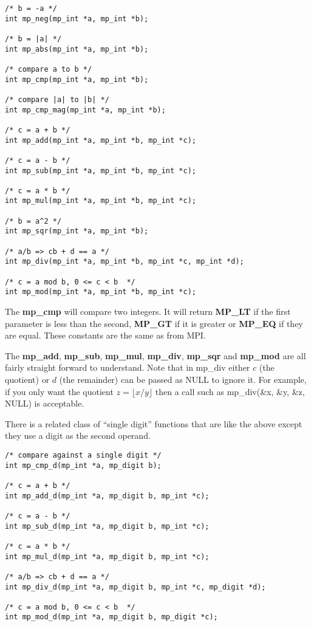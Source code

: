 \documentclass{article}
\begin{document}
\begin{verbatim}
/* b = -a */
int mp_neg(mp_int *a, mp_int *b);

/* b = |a| */
int mp_abs(mp_int *a, mp_int *b);

/* compare a to b */
int mp_cmp(mp_int *a, mp_int *b);

/* compare |a| to |b| */
int mp_cmp_mag(mp_int *a, mp_int *b);

/* c = a + b */
int mp_add(mp_int *a, mp_int *b, mp_int *c);

/* c = a - b */
int mp_sub(mp_int *a, mp_int *b, mp_int *c);

/* c = a * b */
int mp_mul(mp_int *a, mp_int *b, mp_int *c);

/* b = a^2 */
int mp_sqr(mp_int *a, mp_int *b);

/* a/b => cb + d == a */
int mp_div(mp_int *a, mp_int *b, mp_int *c, mp_int *d);

/* c = a mod b, 0 <= c < b  */
int mp_mod(mp_int *a, mp_int *b, mp_int *c);
\end{verbatim}

The \textbf{mp\_cmp} will compare two integers.  It will return \textbf{MP\_LT} if the first parameter is less than
the second, \textbf{MP\_GT} if it is greater or \textbf{MP\_EQ} if they are equal.  These constants are the same as from
MPI.

The \textbf{mp\_add}, \textbf{mp\_sub}, \textbf{mp\_mul}, \textbf{mp\_div}, \textbf{mp\_sqr} and \textbf{mp\_mod} are all
fairly straight forward to understand.  Note that in mp\_div either $c$ (the quotient) or $d$ (the remainder) can be 
passed as NULL to ignore it.  For example, if you only want the quotient $z = \lfloor x/y \rfloor$ then a call such as 
mp\_div(\&x, \&y, \&z, NULL) is acceptable.

There is a related class of ``single digit'' functions that are like the above except they use a digit as the second
operand.

\begin{verbatim}
/* compare against a single digit */
int mp_cmp_d(mp_int *a, mp_digit b);

/* c = a + b */
int mp_add_d(mp_int *a, mp_digit b, mp_int *c);

/* c = a - b */
int mp_sub_d(mp_int *a, mp_digit b, mp_int *c);

/* c = a * b */
int mp_mul_d(mp_int *a, mp_digit b, mp_int *c);

/* a/b => cb + d == a */
int mp_div_d(mp_int *a, mp_digit b, mp_int *c, mp_digit *d);

/* c = a mod b, 0 <= c < b  */
int mp_mod_d(mp_int *a, mp_digit b, mp_digit *c);
\end{verbatim}
\end{document}
